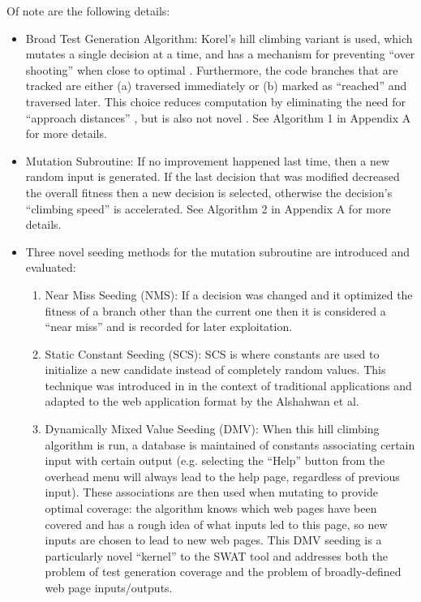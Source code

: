 \documentclass{sig-alternate-05-2015}
\begin{document}
Of note are the following details:
\begin{itemize}
\item Broad Test Generation Algorithm: Korel's hill climbing variant is used, which mutates a single decision at a time, and has a mechanism for preventing ``over shooting'' when close to optimal \cite{korel1990automated}.  Furthermore, the code branches that are tracked are either (a) traversed immediately or (b) marked as ``reached'' and traversed later. This choice reduces computation by eliminating the need for ``approach distances''  \cite{mcminn2004search}, but is also not novel \cite{michael2001generating}. See Algorithm 1 in Appendix A for more details. 
\item Mutation Subroutine: If no improvement happened last time, then a new random input is generated. If the last decision that was modified decreased the overall fitness then a new decision is selected, otherwise the decision's ``climbing speed'' is accelerated.  See Algorithm 2 in Appendix A for more details. 
\item Three novel seeding methods for the mutation subroutine are introduced and evaluated: 

\begin{enumerate}
\item Near Miss Seeding (NMS): If a decision was changed and it optimized the fitness of a branch other than the current one then it is considered a ``near miss'' and is recorded for later exploitation. 
\item Static Constant Seeding (SCS): SCS is where constants are used to initialize a new candidate instead of completely random values. This technique was introduced in \cite{alshraideh2006search} in the context of traditional applications and adapted to the web application format by the Alshahwan et al. 
\item Dynamically Mixed Value Seeding (DMV): When this hill climbing algorithm is run, a database is maintained of constants associating certain input with certain output (e.g. selecting the ``Help'' button from the overhead menu will always lead to the help page, regardless of previous input). These associations are then used when mutating to provide optimal coverage: the algorithm knows which web pages have been covered and has a rough idea of what inputs led to this page, so new inputs are chosen to lead to new web pages. This DMV seeding is a particularly novel ``kernel'' to the SWAT tool and addresses both the problem of test generation coverage and the problem of broadly-defined web page inputs/outputs. 
\end{enumerate}
\end{itemize}
\end{document}
